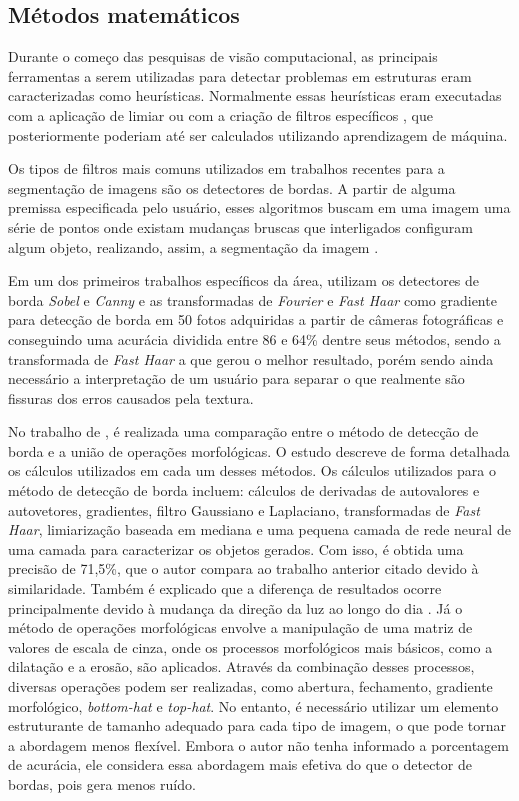 \subsection{Métodos matemáticos}

Durante o começo das pesquisas de visão computacional, as principais ferramentas a serem utilizadas para detectar problemas em estruturas eram caracterizadas como heurísticas. 
Normalmente essas heurísticas eram executadas com a aplicação de limiar ou com a criação de filtros específicos \cite{spencer2019advances}, que posteriormente poderiam até ser calculados utilizando aprendizagem de máquina.

Os tipos de filtros mais comuns utilizados em trabalhos recentes para a segmentação de imagens são os detectores de bordas. 
A partir de alguma premissa especificada pelo usuário, esses algoritmos buscam em uma imagem uma série de pontos onde existam mudanças bruscas que interligados configuram algum objeto, realizando, assim, a segmentação da imagem \cite{ziou1998edge}.

Em um dos primeiros trabalhos específicos da área,  utilizam os detectores de borda \textit{Sobel} e \textit{Canny} e as transformadas de \textit{Fourier} e \textit{Fast Haar} como gradiente para detecção de borda em 50 fotos adquiridas a partir de câmeras fotográficas e conseguindo uma acurácia dividida entre 86 e 64\% dentre seus métodos, sendo a transformada de \textit{Fast Haar} a que gerou o melhor resultado, porém sendo ainda necessário a interpretação de um usuário para separar o que realmente são fissuras dos erros causados pela textura. 

No trabalho de , é realizada uma comparação entre o método de detecção de borda e a união de operações morfológicas. 
O estudo descreve de forma detalhada os cálculos utilizados em cada um desses métodos.
Os cálculos utilizados para o método de detecção de borda incluem: cálculos de derivadas de autovalores e autovetores, gradientes, filtro Gaussiano e Laplaciano, transformadas de \textit{Fast Haar}, limiarização baseada em mediana e uma pequena camada de rede neural de uma camada para caracterizar os objetos gerados. 
Com isso, é obtida uma precisão de 71,5\%, que o autor compara ao trabalho anterior citado devido à similaridade. 
Também é explicado que a diferença de resultados ocorre principalmente devido à mudança da direção da luz ao longo do dia \cite{abdel2003analysis}.
Já o método de operações morfológicas envolve a manipulação de uma matriz de valores de escala de cinza, onde os processos morfológicos mais básicos, como a dilatação e a erosão, são aplicados. 
Através da combinação desses processos, diversas operações podem ser realizadas, como abertura, fechamento, gradiente morfológico, \textit{bottom-hat} e \textit{top-hat}. 
No entanto, é necessário utilizar um elemento estruturante de tamanho adequado para cada tipo de imagem, o que pode tornar a abordagem menos flexível. 
Embora o autor não tenha informado a porcentagem de acurácia, ele considera essa abordagem mais efetiva do que o detector de bordas, pois gera menos ruído.

